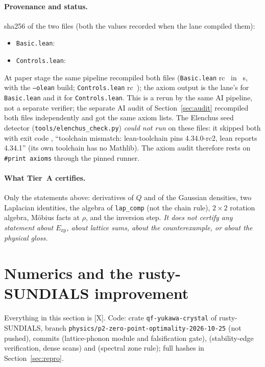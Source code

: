 \documentclass[10pt]{article}
\newcommand{\tier}[1]{\textsf{[#1]}}
\newcommand{\lean}[1]{\texttt{#1}}
\newcommand{\Ezp}{E_{\mathrm{zp}}}
\begin{document}
\paragraph{Provenance and status.} sha256 of the two files (both \ZPShaMatch{} the values recorded when the lane compiled them):
\begin{itemize}\scriptsize\itemsep=0pt
\item \texttt{Basic.lean}: \texttt{\ZPShaBasic}
\item \texttt{Controls.lean}: \texttt{\ZPShaCtl}
\end{itemize}
At paper stage the same pipeline recompiled both files (\texttt{Basic.lean} rc~\ZPLeanRerunRc{} in \ZPLeanRerunSecs~s, with the \lean{--olean} build; \texttt{Controls.lean} rc~\ZPLeanRerunCtlRc);
the axiom output is \ZPLeanRerunSameBasic{} the lane's for \texttt{Basic.lean} and \ZPLeanRerunSameCtl{} it for \texttt{Controls.lean}. This is a rerun by the same AI pipeline, not a separate verifier; the separate AI audit of Section~\ref{sec:audit} recompiled both files independently and got the same axiom lists.
The Elenchus seed detector (\texttt{tools/elenchus\_check.py}) \emph{could not run} on these files: it skipped both with exit code \ZPElenchusSeedRc{}, ``toolchain mismatch: lean-toolchain pins 4.34.0-rc2, lean reports 4.34.1''
(its own toolchain has no Mathlib). The axiom audit therefore rests on \lean{\#print axioms} through the pinned runner.
\paragraph{What Tier~A certifies.} Only the statements above: derivatives of $Q$ and of the Gaussian densities, two Laplacian identities, the algebra of \lean{lap\_comp} (not the chain rule), $2\times2$ rotation algebra,
M\"obius facts at $\rho$, and the inversion step. \emph{It does not certify any statement about $\Ezp$, about lattice sums, about the counterexample, or about the physical gloss.}

\section{Numerics and the rusty-SUNDIALS improvement}\label{sec:num}
Everything in this section is \tier{X}. Code: crate \texttt{qf-yukawa-crystal} of rusty-SUNDIALS, branch
\texttt{physics/p2-zero-point-optimality-2026-10-25} (not pushed), commits \texttt{\ZPRustyGateShort} (lattice-phonon module and falsification gate),
\texttt{\ZPRustyEdgeShort} (stability-edge verification, dense scans) and \texttt{\ZPRustySpectralShort} (spectral zone rule); full hashes in Section~\ref{sec:repro}.
\end{document}

